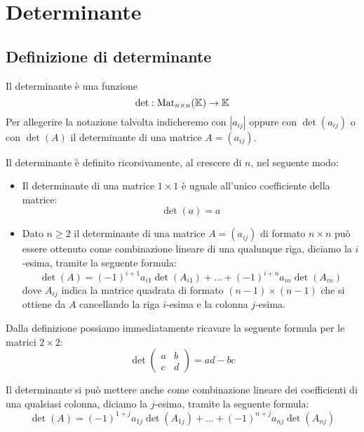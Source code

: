 \chapter{Determinante}
\section{Definizione di determinante}
Il determinante è una funzione
\[ \det : \operatorname{Mat}_{n \times n}(\mathbb{K}) \to \mathbb{K} \]
Per allegerire la notazione talvolta indicheremo con $|a_{ij}|$ oppure con
$\det(a_{ij})$ o con $\det(A)$ il determinante di una matrice $A = (a_{ij})$.

Il determinante è definito ricorsivamente, al crescere di $n$, nel seguente
modo:
\begin{itemize}
	\item Il determinante di una matrice $1 \times 1$ è uguale all'unico
	      coefficiente della matrice:
	      \[ \det(a) = a \]
	\item Dato $n \geq 2$ il determinante di una matrice $A = (a_{ij})$ di
	      formato $n \times n$ può essere ottenuto come combinazione lineare
	      di una qualunque riga, diciamo la $i$-esima, tramite la seguente
	      formula:
	      \[ \det(A) = (-1)^{i + 1}a_{i1}\det(A_{i1}) + \dots + (-1)^{i + n}a_{in}\det(A_{in}) \]
	      dove $A_{ij}$ indica la matrice quadrata di formato
	      $(n - 1) \times (n - 1)$ che si ottiene da $A$ cancellando la riga
	      $i$-esima e la colonna $j$-esima.
\end{itemize}

\begin{observation}
	Dalla definizione possiamo immediatamente ricavare la seguente formula
	per le matrici $2 \times 2$:
	\[
		\det \begin{pmatrix}
			a & b \\
			c & d
		\end{pmatrix} =
		ad - bc
	\]
\end{observation}

\begin{observation}
	Il determinante si può mettere anche come combinazione lineare dei
	coefficienti di una qualsiasi colonna, diciamo la $j$-esima, tramite
	la seguente formula:
	\[ \det(A) = (-1)^{1 + j}a_{1j}\det(A_{1j}) + \dots + (-1)^{n + j}a_{nj}\det(A_{nj}) \]
\end{observation}

